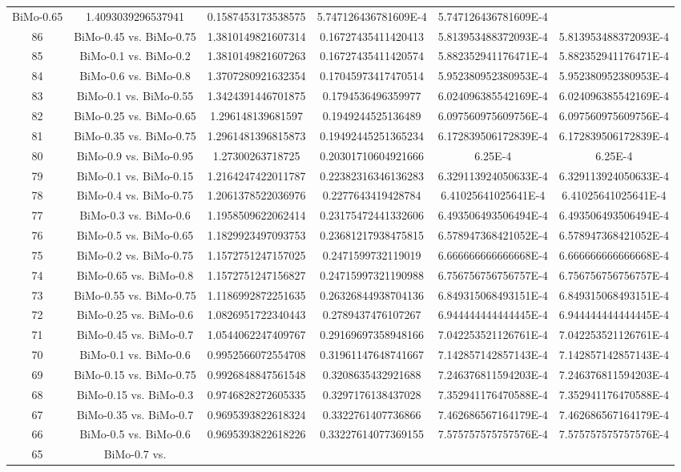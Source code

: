 \documentclass[a4paper,10pt]{article}
\begin{document}
\begin{landscape}
\begin{table}[!htp]
\begin{tabular}{cccccc}
BiMo-0.65&1.4093039296537941&0.1587453173538575&5.747126436781609E-4&5.747126436781609E-4\\86&BiMo-0.45 vs. BiMo-0.75&1.3810149821607314&0.16727435411420413&5.813953488372093E-4&5.813953488372093E-4\\85&BiMo-0.1 vs. BiMo-0.2&1.3810149821607263&0.16727435411420574&5.882352941176471E-4&5.882352941176471E-4\\84&BiMo-0.6 vs. BiMo-0.8&1.3707280921632354&0.17045973417470514&5.952380952380953E-4&5.952380952380953E-4\\83&BiMo-0.1 vs. BiMo-0.55&1.3424391446701875&0.1794536496359977&6.024096385542169E-4&6.024096385542169E-4\\82&BiMo-0.25 vs. BiMo-0.65&1.296148139681597&0.1949244525136489&6.097560975609756E-4&6.097560975609756E-4\\81&BiMo-0.35 vs. BiMo-0.75&1.2961481396815873&0.19492445251365234&6.172839506172839E-4&6.172839506172839E-4\\80&BiMo-0.9 vs. BiMo-0.95&1.27300263718725&0.20301710604921666&6.25E-4&6.25E-4\\79&BiMo-0.1 vs. BiMo-0.15&1.2164247422011787&0.22382316346136283&6.329113924050633E-4&6.329113924050633E-4\\78&BiMo-0.4 vs. BiMo-0.75&1.2061378522036976&0.2277643419428784&6.41025641025641E-4&6.41025641025641E-4\\77&BiMo-0.3 vs. BiMo-0.6&1.1958509622062414&0.23175472441332606&6.493506493506494E-4&6.493506493506494E-4\\76&BiMo-0.5 vs. BiMo-0.65&1.1829923497093753&0.23681217938475815&6.578947368421052E-4&6.578947368421052E-4\\75&BiMo-0.2 vs. BiMo-0.75&1.1572751247157025&0.2471599732119019&6.666666666666668E-4&6.666666666666668E-4\\74&BiMo-0.65 vs. BiMo-0.8&1.1572751247156827&0.24715997321190988&6.756756756756757E-4&6.756756756756757E-4\\73&BiMo-0.55 vs. BiMo-0.75&1.1186992872251635&0.26326844938704136&6.849315068493151E-4&6.849315068493151E-4\\72&BiMo-0.25 vs. BiMo-0.6&1.0826951722340443&0.2789437476107267&6.944444444444445E-4&6.944444444444445E-4\\71&BiMo-0.45 vs. BiMo-0.7&1.0544062247409767&0.29169697358948166&7.042253521126761E-4&7.042253521126761E-4\\70&BiMo-0.1 vs. BiMo-0.6&0.9952566072554708&0.31961147648741667&7.142857142857143E-4&7.142857142857143E-4\\69&BiMo-0.15 vs. BiMo-0.75&0.9926848847561548&0.3208635432921688&7.246376811594203E-4&7.246376811594203E-4\\68&BiMo-0.15 vs. BiMo-0.3&0.9746828272605335&0.3297176138437028&7.352941176470588E-4&7.352941176470588E-4\\67&BiMo-0.35 vs. BiMo-0.7&0.9695393822618324&0.3322761407736866&7.462686567164179E-4&7.462686567164179E-4\\66&BiMo-0.5 vs. BiMo-0.6&0.9695393822618226&0.33227614077369155&7.575757575757576E-4&7.575757575757576E-4\\65&BiMo-0.7 vs. 
\end{tabular}
\end{table}
\end{landscape}
\end{document}
